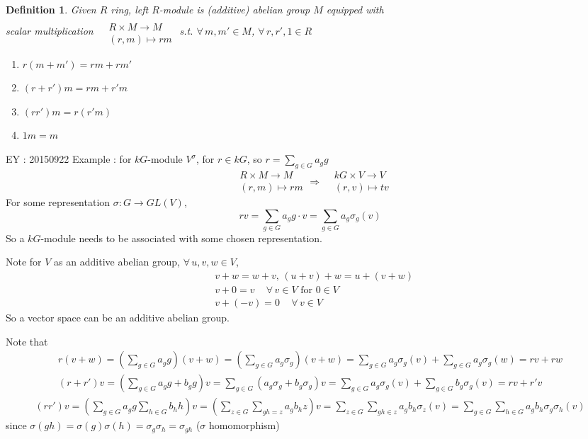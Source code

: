 \documentclass[10pt]{amsart}
\newtheorem{definition}{Definition}
\begin{document}
\begin{multicols*}{2}
\begin{definition}
  Given $R$ ring, left $R$-module is (additive) abelian group $M$ equipped with \\
scalar multiplication $\begin{aligned} & \quad \\
  & R \times M \to M \\
& (r,m) \mapsto rm \end{aligned}$ s.t. $\forall \, m , m' \in M$, $\forall \, r, r' , 1 \in R$
\begin{enumerate}
  \item[(i)] $r (m+m') = rm + rm' $ 
    \item[(ii)] $(r+r')m = rm + r'm $ 
\item[(iii)] $(rr')m = r(r'm)$
\item[(iv)] $1m = m$
\end{enumerate}
\end{definition}

EY : 20150922 Example : for $kG$-module $V^{\sigma}$, for $r \in kG$, so $r= \sum_{g\in G} a_g g$ 
\[
\begin{aligned} & R \times M \to M \\
  & (r,m) \mapsto rm \end{aligned} \Longrightarrow \begin{aligned} & kG \times V \to V \\
  & (r,v) \mapsto tv \end{aligned}
\]
For some representation $\sigma : G \to GL(V)$, 
\[
rv = \sum_{g \in G} a_g g \cdot v =\sum_{g\in G} a_g \sigma_g(v)
\]
So a $kG$-module needs to be associated with some chosen representation.  

Note for $V$ as an additive abelian group, $\forall \, u,v,w \in V$, 
\[
\begin{aligned}
  & v+w = w+v, \, (u+v) + w = u+(v+w) \\ 
  & v+0 = v \quad \, \forall \, v \in V \text{ for } 0 \in V \\ 
  & v+ (-v) =0 \quad \, \forall \, v \in V
\end{aligned}
\]
So a vector space can be an additive abelian group.  

Note that 
\[
\begin{gathered}
  r(v+w) = \left( \sum_{g\in G} a_g g \right)(v+w) = \left( \sum_{g \in G} a_g \sigma_g \right)(v+w) = \sum_{g\in G} a_g \sigma_g(v) + \sum_{g\in G} a_g \sigma_g(w) = rv + rw \\ 
  (r+r')v = \left( \sum_{g\in G} a_g g + b_g g \right) v =\sum_{g\in G} (a_g \sigma_g + b_g \sigma_g ) v = \sum_{g \in G}a_g \sigma_g(v) + \sum_{g\in G}b_g \sigma_g(v) = rv + r'v 
\end{gathered}
\]
\[
\begin{gathered}
  (rr')v = \left( \sum_{g\in G} a_g g \sum_{h \in G} b_h h \right)v = \left( \sum_{z\in G} \sum_{gh = z} a_g b_h z \right) v = \sum_{z\in G} \sum_{gh \in z} a_g b_h \sigma_z(v) = \sum_{g\in G} \sum_{h \in G} a_g b_h \sigma_g \sigma_h (v)
\end{gathered}
\]
since $\sigma(gh) = \sigma(g) \sigma(h) = \sigma_g \sigma_h = \sigma_{gh}$ ($\sigma$ homomorphism)


\end{multicols*}
\end{document}
